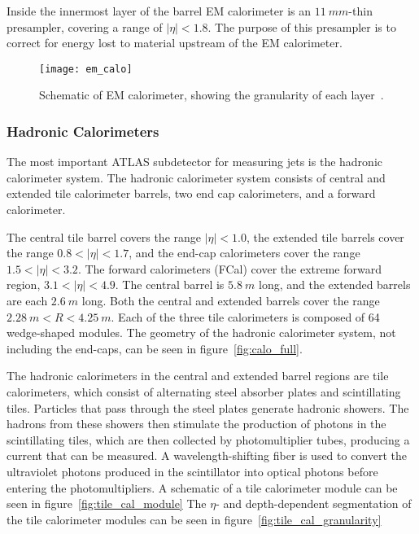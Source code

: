 Inside the innermost layer of the barrel EM calorimeter is an $11~mm$-thin presampler, covering a range of $|\eta| < 1.8$.
The purpose of this presampler is to correct for energy lost to material upstream of the EM calorimeter.

\begin{figure}[!ht]\centering
\texttt{[image: em\_calo]}
\caption{Schematic of EM calorimeter, showing the granularity of each layer~\cite{em-calo}.}
\label{fig:em_calo}
\end{figure}

\subsubsection{Hadronic Calorimeters}\label{subsubsec:had_cal}

The most important ATLAS subdetector for measuring jets is the hadronic calorimeter system.
The hadronic calorimeter system consists of central and extended tile calorimeter barrels, two end cap calorimeters, and a forward calorimeter.

The central tile barrel covers the range $|\eta|<1.0$, the extended tile barrels cover the range $0.8 < |\eta| < 1.7$, and the end-cap calorimeters cover the range $1.5 < |\eta| < 3.2$.
The forward calorimeters (FCal) cover the extreme forward region, $3.1 < |\eta| < 4.9$.
The central barrel is $5.8~m$ long, and the extended barrels are each $2.6~m$ long.
Both the central and extended barrels cover the range $2.28~m < R < 4.25~m$.
Each of the three tile calorimeters is composed of 64 wedge-shaped modules.
The geometry of the hadronic calorimeter system, not including the end-caps, can be seen in figure~\ref{fig:calo_full}.

The hadronic calorimeters in the central and extended barrel regions are tile calorimeters, which consist of alternating steel absorber plates and scintillating tiles.
Particles that pass through the steel plates generate hadronic showers.
The hadrons from these showers then stimulate the production of photons in the scintillating tiles, which are then collected by photomultiplier tubes, producing a current that can be measured.
A wavelength-shifting fiber is used to convert the ultraviolet photons produced in the scintillator into optical photons before entering the photomultipliers.
A schematic of a tile calorimeter module can be seen in figure~\ref{fig:tile_cal_module}
The $\eta$- and depth-dependent segmentation of the tile calorimeter modules can be seen in figure~\ref{fig:tile_cal_granularity}

